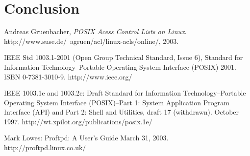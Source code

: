 \documentclass[draft]{article}
\begin{document}

\section*{Conclusion}

\begin{thebibliography}{9}


 
  Andreas Gruenbacher,
  \emph{POSIX Acess Control Lists on Linux}.
  http://www.suse.de/~agruen/acl/linux-acls/online/,
  2003.

    IEEE Std 1003.1-2001 (Open Group Technical Standard, Issue 6), 
	Standard for Information Technology--Portable Operating System Interface (POSIX) 2001. 
	ISBN 0-7381-3010-9. 
	http://www.ieee.org/

    IEEE 1003.1e and 1003.2c: Draft Standard for Information Technology--Portable Operating System Interface (POSIX)--Part 1: System Application Program Interface (API) and Part 2: Shell and Utilities, draft 17 (withdrawn). 
	October 1997. 
	http://wt.xpilot.org/publications/posix.1e/

	Mark Lowes: 
	Proftpd: 
	A User's Guide March 31, 2003. 
	http://proftpd.linux.co.uk/

\end{thebibliography}


\end{document}
